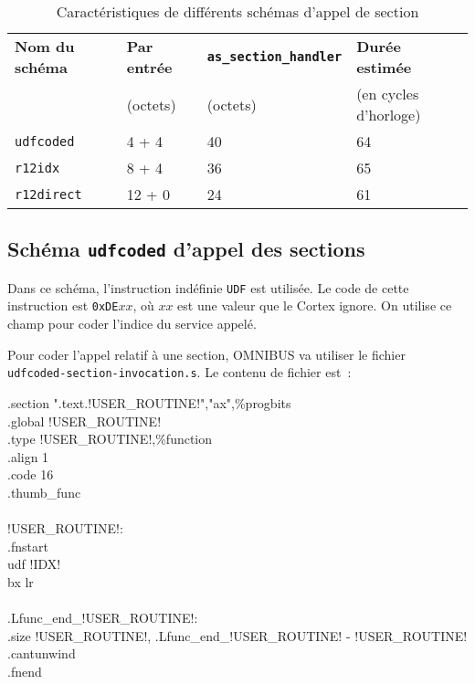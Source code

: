 \begin{table}[t]
\centering
\begin{tabular}{llll}
  \textbf{Nom du schéma} & \textbf{Par entrée} & \textbf{\texttt{as\_section\_handler}} & \textbf{Durée estimée} \\
   & (octets) & (octets) & (en cycles d'horloge) \\
  \texttt{udfcoded} & 4 + 4 & 40 & 64 \\
  \texttt{r12idx} & 8 + 4 & 36 & 65 \\
  \texttt{r12direct} & 12 + 0 & 24 & 61 \\
\end{tabular}
\caption{Caractéristiques de différents schémas d'appel de section}
\ligne
\end{table}


\subsection{Schéma \texttt{udfcoded} d'appel des sections}

Dans ce schéma, l'instruction indéfinie \texttt{UDF} est utilisée. Le code de cette instruction est \texttt{0xDE$xx$}, où $xx$ est une valeur que le Cortex ignore. On utilise ce champ pour coder l'indice du service appelé.

Pour coder l'appel relatif à une section, OMNIBUS va utiliser le fichier \texttt{udfcoded-section-invocation.s}. Le contenu de fichier est~:
\begin{SHELL}\small
\hspace*{1.2em}.section  ".text.!USER\_ROUTINE!","ax",\%progbits\\
\hspace*{1.2em}.global !USER\_ROUTINE!\\
\hspace*{1.2em}.type  !USER\_ROUTINE!,\%function\\
\hspace*{1.2em}.align  1\\
\hspace*{1.2em}.code  16\\
\hspace*{1.2em}.thumb\_func\\
\\
!USER\_ROUTINE!:\\
\hspace*{1.2em}.fnstart\\
\hspace*{1.2em}udf !IDX!\\
\hspace*{1.2em}bx  lr\\
\\
.Lfunc\_end\_!USER\_ROUTINE!:\\
\hspace*{1.2em}.size  !USER\_ROUTINE!, .Lfunc\_end\_!USER\_ROUTINE! - !USER\_ROUTINE!\\
\hspace*{1.2em}.cantunwind\\
\hspace*{1.2em}.fnend
\end{SHELL}

